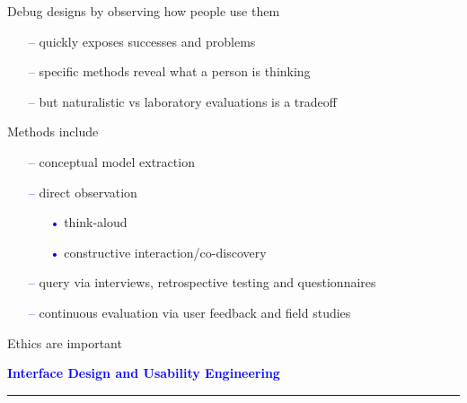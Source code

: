 \documentclass[pdf]{beamer}
\begin{document}
{{{{{{{{{{{{{{{{{{\begin{frame}
	{\Large Debug designs by observing how people use them}\par
    \begin{itemize}
		\item[\textcolor{Blue}{--}] quickly exposes successes and problems
        \item[\textcolor{Blue}{--}] specific methods reveal what a person is thinking
        \item[\textcolor{Blue}{--}] but naturalistic vs laboratory evaluations is a tradeoff
    \end{itemize}
   \bigskip
	{\Large Methods include}\par
    \begin{itemize}
		\item[\textcolor{Blue}{--}] conceptual model extraction
        \item[\textcolor{Blue}{--}] direct observation
        \begin{itemize}
        \item[\textcolor{Blue}{•}] think-aloud
        \item[\textcolor{Blue}{•}] constructive interaction/co-discovery
      \end{itemize}
        \item[\textcolor{Blue}{--}] query via interviews, retrospective testing and questionnaires
        \item[\textcolor{Blue}{--}] continuous evaluation via user feedback and field studies
    \end{itemize}	
    \bigskip
	{\Large Ethics are important}\par
\end{frame}



{
\begin{frame} 
	\vspace{8mm}
	\textcolor{Blue}{\textbf{\large{Interface Design and Usability Engineering}}}
    \textcolor{red}{\rule{10cm}{1mm}}
    

\end{frame}}}}}}}}}}}}}}}}}}}}
\end{document}
